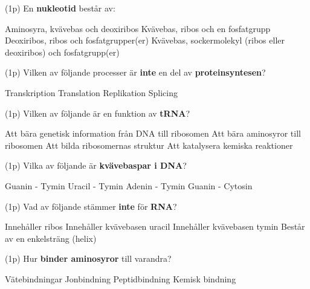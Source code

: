 \documentclass{exam}
\begin{document}
\begin{questions}

\question (1p) En \textbf{nukleotid} består av:
\begin{checkboxes}
   \choice Aminosyra, kvävebas och deoxiribos
   \choice Kvävebas, ribos och en fosfatgrupp
   \choice Deoxiribos, ribos och fosfatgrupper(er)
   \correctchoice Kvävebas, sockermolekyl (ribos eller deoxiribos) och fosfatgrupp(er)
\end{checkboxes}
\vspace{5mm}

\question (1p) Vilken av följande processer är \textbf{inte} en del av \textbf{proteinsyntesen}?
\begin{checkboxes}
    \choice Transkription
    \choice Translation
    \correctchoice Replikation
    \choice Splicing
\end{checkboxes}
\vspace{5mm}

\question (1p) Vilken av följande är en funktion av \textbf{tRNA}?
\begin{checkboxes}
\choice Att bära genetisk information från DNA till ribosomen
\correctchoice Att bära aminosyror till ribosomen
\choice Att bilda ribosomernas struktur
\choice Att katalysera kemiska reaktioner
\end{checkboxes}
\vspace{5mm}

\question (1p) Vilka av följande är \textbf{kvävebaspar i DNA}?
\begin{checkboxes}
   \choice Guanin - Tymin
   \choice Uracil - Tymin
   \correctchoice Adenin - Tymin
   \correctchoice Guanin - Cytosin
\end{checkboxes}
\vspace{5mm}
\break
\question (1p) Vad av följande stämmer \textbf{inte} för \textbf{RNA}?
\begin{checkboxes}
   \choice Innehåller ribos
   \choice Innehåller kvävebasen uracil
   \correctchoice Innehåller kvävebasen tymin
   \choice Består av en enkelsträng (helix)
\end{checkboxes}
\vspace{5mm}

\question (1p) Hur \textbf{binder aminosyror} till varandra?
\begin{checkboxes}
   \choice Vätebindningar
   \choice Jonbindning
   \correctchoice Peptidbindning
   \choice Kemisk bindning
\end{checkboxes}
\vspace{5mm}


\end{questions}
\end{document}

